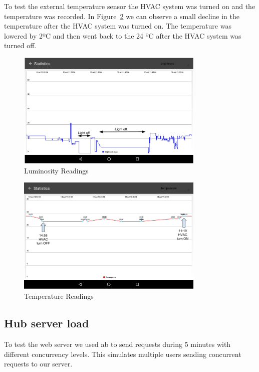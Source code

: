 To test the external temperature sensor the HVAC system was turned on and the temperature was recorded. In Figure~\ref{eval:temp} we can observe a small decline in the temperature after the HVAC system was turned on. The temperature was lowered by 2ºC and then went back to the 24 ºC after the HVAC system was turned off.

\begin{figure}[]
\centering
\includegraphics[width=0.8\textwidth]{Figures/eval_lights}
\caption{Luminosity Readings}
\label{eval:lights}
\end{figure}

\begin{figure}[]
\centering
\includegraphics[width=0.8\textwidth]{Figures/eval_temp}
\caption{Temperature Readings}
\label{eval:temp}
\end{figure}


\subsection{Hub server load}

To test the web server we used \ac{ab} to send requests during 5 minutes with different concurrency levels. This simulates multiple users sending concurrent requests to our server.

